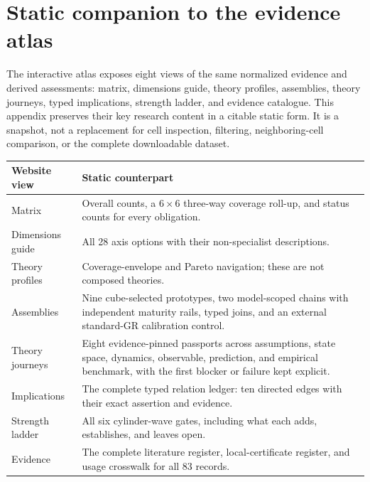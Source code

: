 \section{Static companion to the evidence atlas}
\label{app:atlas-companion}

The interactive atlas exposes eight views of the same normalized evidence and derived assessments: matrix, dimensions guide, theory profiles, assemblies, theory journeys, typed implications, strength ladder, and evidence catalogue.  This appendix preserves their key research content in a citable static form.  It is a snapshot, not a replacement for cell inspection, filtering, neighboring-cell comparison, or the complete downloadable dataset.

\begin{center}
\small
\begin{tabularx}{\textwidth}{@{}p{}Y@{}}
\toprule
Website view & Static counterpart \\
\midrule
Matrix & Overall counts, a \(6\times6\) three-way coverage roll-up, and status counts for every obligation. \\
Dimensions guide & All 28 axis options with their non-specialist descriptions. \\
Theory profiles & Coverage-envelope and Pareto navigation; these are not composed theories. \\
Assemblies & Nine cube-selected prototypes, two model-scoped chains with independent maturity rails, typed joins, and an external standard-GR calibration control. \\
Theory journeys & Eight evidence-pinned passports across assumptions, state space, dynamics, observable, prediction, and empirical benchmark, with the first blocker or failure kept explicit. \\
Implications & The complete typed relation ledger: ten directed edges with their exact assertion and evidence. \\
Strength ladder & All six cylinder-wave gates, including what each adds, establishes, and leaves open. \\
Evidence & The complete literature register, local-certificate register, and usage crosswalk for all 83 records. \\
\bottomrule
\end{tabularx}
\end{center}

